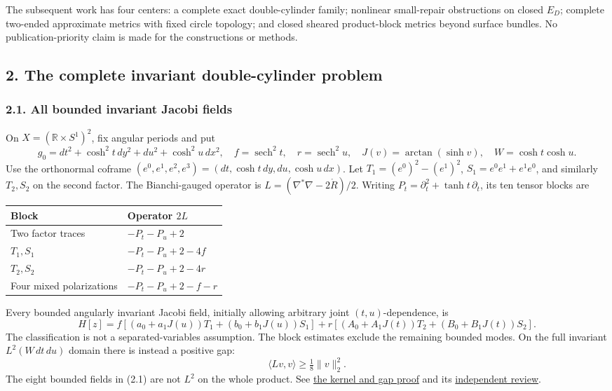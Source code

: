 \documentclass[
  english,
]{article}
\begin{document}
The subsequent work has four centers: a complete exact double-cylinder
family; nonlinear small-repair obstructions on closed \(E_D\); complete
two-ended approximate metrics with fixed circle topology; and closed
sheared product-block metrics beyond surface bundles. No
publication-priority claim is made for the constructions or methods.

\hypertarget{the-complete-invariant-double-cylinder-problem}{%
\subsection{2. The complete invariant double-cylinder
problem}\label{the-complete-invariant-double-cylinder-problem}}

\hypertarget{all-bounded-invariant-jacobi-fields}{%
\subsubsection{2.1. All bounded invariant Jacobi
fields}\label{all-bounded-invariant-jacobi-fields}}

On \(X=(\mathbb R\times S^1)^2\), fix angular periods and put \[
g_0=dt^2+\cosh^2t\,dy^2+du^2+\cosh^2u\,dx^2,\quad
f=\operatorname{sech}^2t,\quad r=\operatorname{sech}^2u,\quad
J(v)=\arctan(\sinh v),\quad W=\cosh t\cosh u.
\] Use the orthonormal coframe
\((e^0,e^1,e^2,e^3)=(dt,\cosh t\,dy,du,\cosh u\,dx)\). Let
\(T_1=(e^0)^2-(e^1)^2\), \(S_1=e^0e^1+e^1e^0\), and similarly
\(T_2,S_2\) on the second factor. The Bianchi-gauged operator is
\(L=(\nabla^*\nabla-2\mathring R)/2\). Writing
\(P_t=\partial_t^2+\tanh t\,\partial_t\), its ten tensor blocks are

\begin{longtable}[]{@{}ll@{}}
\toprule
Block & Operator \(2L\)\tabularnewline
\midrule
\endhead
Two factor traces & \(-P_t-P_u+2\)\tabularnewline
\(T_1,S_1\) & \(-P_t-P_u+2-4f\)\tabularnewline
\(T_2,S_2\) & \(-P_t-P_u+2-4r\)\tabularnewline
Four mixed polarizations & \(-P_t-P_u+2-f-r\)\tabularnewline
\bottomrule
\end{longtable}

Every bounded angularly invariant Jacobi field, initially allowing
arbitrary joint \((t,u)\)-dependence, is \[
H[z]=f[(a_0+a_1J(u))T_1+(b_0+b_1J(u))S_1]
 +r[(A_0+A_1J(t))T_2+(B_0+B_1J(t))S_2].
\tag{2.1}
\] The classification is not a separated-variables assumption. The block
estimates exclude the remaining bounded modes. On the full invariant
\(L^2(W\,dt\,du)\) domain there is instead a positive gap: \[
\langle Lv,v\rangle\ge\tfrac18\|v\|_2^2.
\tag{2.2}
\] The eight bounded fields in (2.1) are not \(L^2\) on the whole
product. See \href{../proofs/round2_construction.md}{the kernel and gap
proof} and its
\href{../proofs/round2_construction_review.md}{independent review}.
\end{document}
